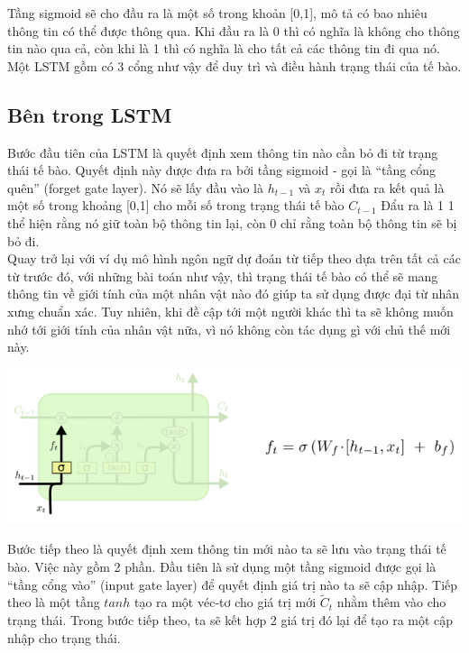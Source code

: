 Tầng sigmoid sẽ cho đầu ra là một số trong khoản [0,1], mô tả có bao nhiêu thông tin có thể được thông qua. Khi đầu ra là 0 thì có nghĩa là không cho thông tin nào qua cả, còn khi là 1 thì có nghĩa là cho tất cả các thông tin đi qua nó.\\
Một LSTM gồm có 3 cổng như vậy để duy trì và điều hành trạng thái của tế bào.
\subsection{Bên trong LSTM}
Bước đầu tiên của LSTM là quyết định xem thông tin nào cần bỏ đi từ trạng thái tế bào. Quyết định này được đưa ra bởi tầng sigmoid - gọi là “tầng cổng quên” (forget gate layer). Nó sẽ lấy đầu vào là $h_{t-1}$ và $x_{t}$ rồi đưa ra kết quả là một số trong khoảng [0,1] cho mỗi số trong trạng thái tế bào $C_{t-1}$ Đẩu ra là 1 1 thể hiện rằng nó giữ toàn bộ thông tin lại, còn 0 chỉ rằng toàn bộ thông tin sẽ bị bỏ đi.\\
Quay trở lại với ví dụ mô hình ngôn ngữ dự đoán từ tiếp theo dựa trên tất cả các từ trước đó, với những bài toán như vậy, thì trạng thái tế bào có thể sẽ mang thông tin về giới tính của một nhân vật nào đó giúp ta sử dụng được đại từ nhân xưng chuẩn xác. Tuy nhiên, khi đề cập tới một người khác thì ta sẽ không muốn nhớ tới giới tính của nhân vật nữa, vì nó không còn tác dụng gì với chủ thế mới này.
\begin{center}
    \includegraphics[scale=.5]{image/chapter6/bt1.png}
    \begin{figure}[htp]
    \begin{center}
     
    \end{center}
    \end{figure}
\end{center}
Bước tiếp theo là quyết định xem thông tin mới nào ta sẽ lưu vào trạng thái tế bào. Việc này gồm 2 phần. Đầu tiên là sử dụng một tầng sigmoid được gọi là “tầng cổng vào” (input gate layer) để quyết định giá trị nào ta sẽ cập nhập. Tiếp theo là một tầng $tanh$ tạo ra một véc-tơ cho giá trị mới $\widetilde{C}_{t}$ nhằm thêm vào cho trạng thái. Trong bước tiếp theo, ta sẽ kết hợp 2 giá trị đó lại để tạo ra một cập nhập cho trạng thái.\\
